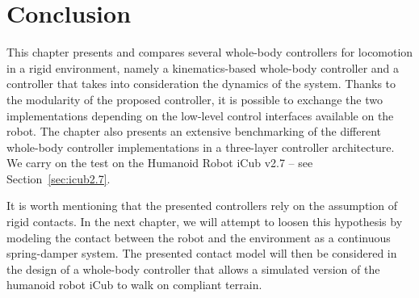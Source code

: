 \section{Conclusion\label{sec:wbc_conclusion}}
This chapter presents and compares several whole-body controllers for locomotion in a rigid environment, namely a kinematics-based whole-body controller and a controller that takes into consideration the dynamics of the system. Thanks to the modularity of the proposed controller, it is possible to exchange the two implementations depending on the low-level control interfaces available on the robot.
The chapter also presents an extensive benchmarking of the different whole-body controller implementations in a three-layer controller architecture. We carry on the test on the Humanoid Robot iCub v2.7 -- see Section~\ref{sec:icub2.7}.
\par
It is worth mentioning that the presented controllers rely on the assumption of rigid contacts. In the next chapter, we will attempt to loosen this hypothesis by modeling the contact between the robot and the environment as a continuous spring-damper system. The presented contact model will then be considered in the design of a whole-body controller that allows a simulated version of the humanoid robot iCub to walk on compliant terrain.